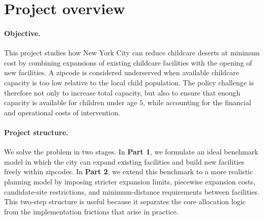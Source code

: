 \documentclass[11pt]{article}
\newcommand{\1}{\mathbb{I}}
\begin{document}


\section*{Project overview}


\paragraph{Objective.}
This project studies how New York City can reduce childcare deserts at minimum cost by combining expansions of existing childcare facilities with the opening of new facilities. A zipcode is considered underserved when available childcare capacity is too low relative to the local child population. The policy challenge is therefore not only to increase total capacity, but also to ensure that enough capacity is available for children under age \(5\), while accounting for the financial and operational costs of intervention.

\paragraph{Project structure.}
We solve the problem in two stages. In \textbf{Part 1}, we formulate an ideal benchmark model in which the city can expand existing facilities and build new facilities freely within zipcodes. In \textbf{Part 2}, we extend this benchmark to a more realistic planning model by imposing stricter expansion limits, piecewise expansion costs, candidate-site restrictions, and minimum-distance requirements between facilities. This two-step structure is useful because it separates the core allocation logic from the implementation frictions that arise in practice.
\end{document}
